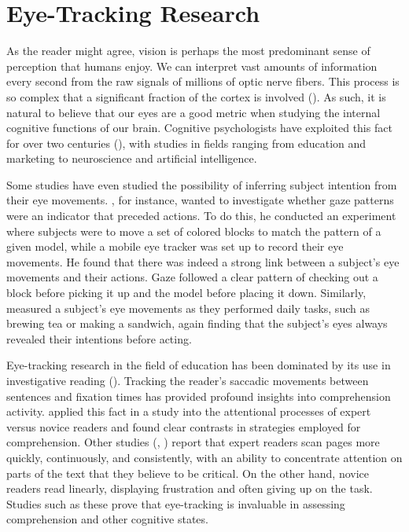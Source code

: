 \section{Eye-Tracking Research} \label{sec:pr_EyeTrackingResearch}

As the reader might agree, vision is perhaps the most predominant sense of perception that humans enjoy. We can interpret vast amounts of information every second from the raw signals of millions of optic nerve fibers. This process is so complex that a significant fraction of the cortex is involved (\cite{klatzky2012}). As such, it is natural to believe that our eyes are a good metric when studying the internal cognitive functions of our brain. Cognitive psychologists have exploited this fact for over two centuries (\cite{eckstein2017}), with studies in fields ranging from education and marketing to neuroscience and artificial intelligence.

Some studies have even studied the possibility of inferring subject intention from their eye movements. \cite{ballard1992}, for instance, wanted to investigate whether gaze patterns were an indicator that preceded actions. To do this, he conducted an experiment where subjects were to move a set of colored blocks to match the pattern of a given model, while a mobile eye tracker was set up to record their eye movements. He found that there was indeed a strong link between a subject's eye movements and their actions. Gaze followed a clear pattern of checking out a block before picking it up and the model before placing it down. Similarly, \cite{land1999} measured a subject's eye movements as they performed daily tasks, such as brewing tea or making a sandwich, again finding that the subject's eyes always revealed their intentions before acting.


Eye-tracking research in the field of education has been dominated by its use in investigative reading (\cite{knight2014}). Tracking the reader's saccadic movements between sentences and fixation times has provided profound insights into comprehension activity. \cite{vangog2009} applied this fact in a study into the attentional processes of expert versus novice readers and found clear contrasts in strategies employed for comprehension. Other studies (\cite{rayner1998}, \cite{rayner2008}) report that expert readers scan pages more quickly, continuously, and consistently, with an ability to concentrate attention on parts of the text that they believe to be critical. On the other hand, novice readers read linearly, displaying frustration and often giving up on the task. Studies such as these prove that eye-tracking is invaluable in assessing comprehension and other cognitive states.